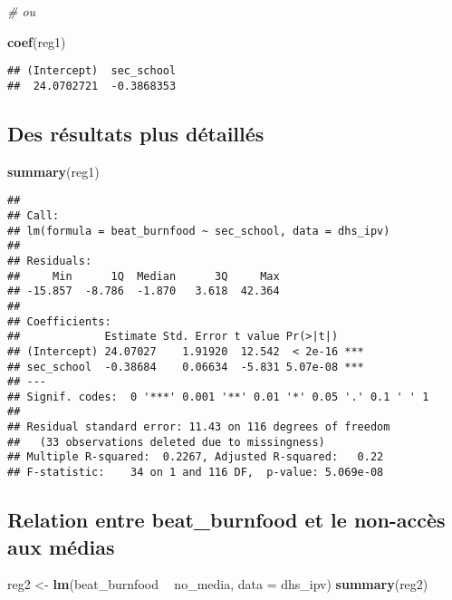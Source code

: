 \documentclass[
]{article}
\newenvironment{Shaded}{\begin{snugshade}}{\end{snugshade}}
\newcommand{\CommentTok}[1]{\textcolor[rgb]{0.56,0.35,0.01}{\textit{#1}}}
\newcommand{\DataTypeTok}[1]{\textcolor[rgb]{0.13,0.29,0.53}{#1}}
\newcommand{\KeywordTok}[1]{\textcolor[rgb]{0.13,0.29,0.53}{\textbf{#1}}}
\newcommand{\NormalTok}[1]{#1}
\newcommand{\OperatorTok}[1]{\textcolor[rgb]{0.81,0.36,0.00}{\textbf{#1}}}
\newcommand{\StringTok}[1]{\textcolor[rgb]{0.31,0.60,0.02}{#1}}
\begin{document}
\begin{Shaded}
\begin{Highlighting}[]
\CommentTok{# ou}

\KeywordTok{coef}\NormalTok{(reg1)}
\end{Highlighting}
\end{Shaded}

\begin{verbatim}
## (Intercept)  sec_school 
##  24.0702721  -0.3868353
\end{verbatim}

\hypertarget{des-ruxe9sultats-plus-duxe9tailluxe9s}{%
\subsection{Des résultats plus
détaillés}\label{des-ruxe9sultats-plus-duxe9tailluxe9s}}

\begin{Shaded}
\begin{Highlighting}[]
\KeywordTok{summary}\NormalTok{(reg1)}
\end{Highlighting}
\end{Shaded}

\begin{verbatim}
## 
## Call:
## lm(formula = beat_burnfood ~ sec_school, data = dhs_ipv)
## 
## Residuals:
##     Min      1Q  Median      3Q     Max 
## -15.857  -8.786  -1.870   3.618  42.364 
## 
## Coefficients:
##             Estimate Std. Error t value Pr(>|t|)    
## (Intercept) 24.07027    1.91920  12.542  < 2e-16 ***
## sec_school  -0.38684    0.06634  -5.831 5.07e-08 ***
## ---
## Signif. codes:  0 '***' 0.001 '**' 0.01 '*' 0.05 '.' 0.1 ' ' 1
## 
## Residual standard error: 11.43 on 116 degrees of freedom
##   (33 observations deleted due to missingness)
## Multiple R-squared:  0.2267, Adjusted R-squared:   0.22 
## F-statistic:    34 on 1 and 116 DF,  p-value: 5.069e-08
\end{verbatim}

\hypertarget{relation-entre-beat_burnfood-et-le-non-accuxe8s-aux-muxe9dias}{%
\subsection{Relation entre beat\_burnfood et le non-accès aux
médias}\label{relation-entre-beat_burnfood-et-le-non-accuxe8s-aux-muxe9dias}}

\begin{Shaded}
\begin{Highlighting}[]
\NormalTok{reg2 <-}\StringTok{ }\KeywordTok{lm}\NormalTok{(beat_burnfood }\OperatorTok{~}\StringTok{  }\NormalTok{no_media, }\DataTypeTok{data =}\NormalTok{ dhs_ipv)}
\KeywordTok{summary}\NormalTok{(reg2)}
\end{Highlighting}
\end{Shaded}
\end{document}
